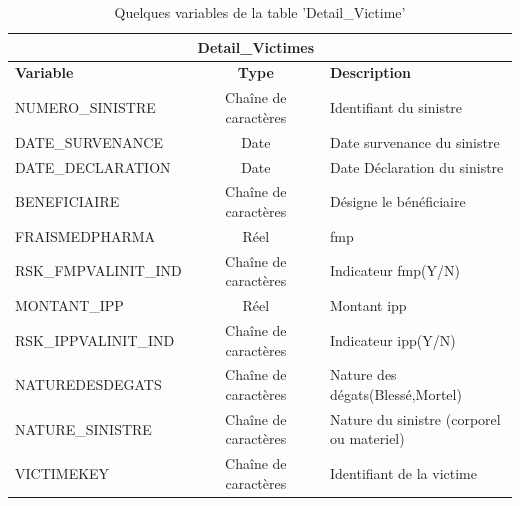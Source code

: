 
\begin{table}[H]
\caption{Quelques variables de la table 'Detail\_Victime'}
{\footnotesize 
\begin{center}
\begin{tabular}{lcl}
\toprule 
& \textbf{Detail\_Victimes} &  \\
\midrule
\textbf{Variable}                                 & \textbf{Type}                         & \textbf{Description}  \\
\hline 
NUMERO\_SINISTRE                          & Cha\^ine de caract\`eres    & Identifiant du sinistre   \\ 
DATE\_SURVENANCE                          & Date                        & Date survenance du sinistre   \\ 
DATE\_DECLARATION                         & Date                        & Date Déclaration du sinistre   \\ 
BENEFICIAIRE                             & Cha\^ine de caract\`eres     & Désigne le b\'en\'eficiaire   \\ 
FRAISMEDPHARMA                           & R\'eel                       & \acrfull{fmp} \\
RSK\_FMPVALINIT\_IND                     & Cha\^ine de caract\`eres     & Indicateur \acrshort{fmp}(Y/N)\\
MONTANT\_IPP                             & R\'eel                       & Montant \acrfull{ipp}\\
RSK\_IPPVALINIT\_IND                     & Cha\^ine de caract\`eres     & Indicateur \acrshort{ipp}(Y/N)        \\
NATUREDESDEGATS                          & Cha\^ine de caract\`eres     & Nature des d\'egats(Bless\'e,Mortel) \\
NATURE\_SINISTRE                          & Cha\^ine de caract\`eres     & Nature du sinistre (corporel ou materiel) \\
VICTIMEKEY                               & Cha\^ine de caract\`eres     & Identifiant de la victime \\
\bottomrule
\end{tabular}
\end{center}}

\end{table}


\normalfont
